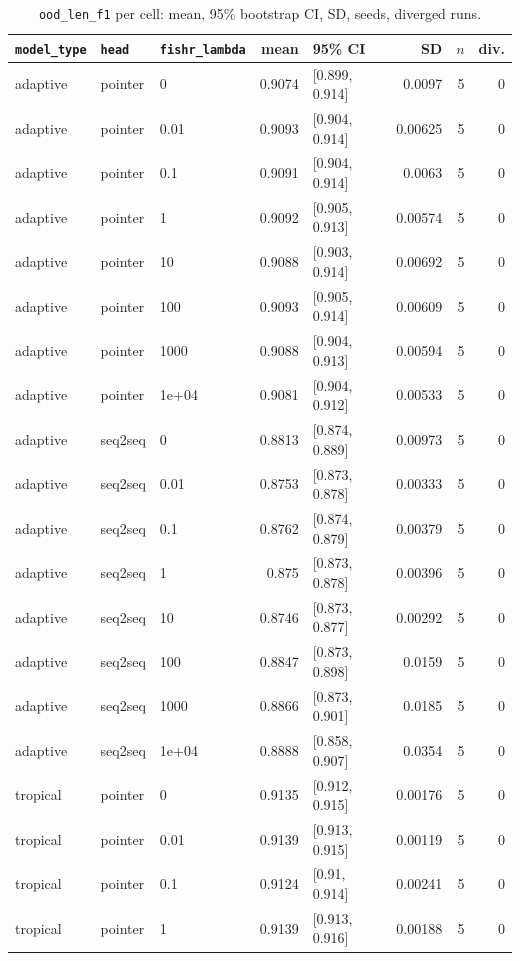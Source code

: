 \documentclass[10pt]{article}
\begin{document}
{\small
\begin{longtable}{lllrlrrr}
\caption{\texttt{ood\_len\_f1} per cell: mean, 95\% bootstrap CI, SD, seeds, diverged runs.}\label{tab:summary-ood_len_f1}\\
\toprule
\texttt{model\_type} & \texttt{head} & \texttt{fishr\_lambda} & mean & 95\% CI & SD & $n$ & div.\\
\midrule
\endhead
adaptive & pointer & 0 & 0.9074 & [0.899, 0.914] & 0.0097 & 5 & 0\\
adaptive & pointer & 0.01 & 0.9093 & [0.904, 0.914] & 0.00625 & 5 & 0\\
adaptive & pointer & 0.1 & 0.9091 & [0.904, 0.914] & 0.0063 & 5 & 0\\
adaptive & pointer & 1 & 0.9092 & [0.905, 0.913] & 0.00574 & 5 & 0\\
adaptive & pointer & 10 & 0.9088 & [0.903, 0.914] & 0.00692 & 5 & 0\\
adaptive & pointer & 100 & 0.9093 & [0.905, 0.914] & 0.00609 & 5 & 0\\
adaptive & pointer & 1000 & 0.9088 & [0.904, 0.913] & 0.00594 & 5 & 0\\
adaptive & pointer & 1e+04 & 0.9081 & [0.904, 0.912] & 0.00533 & 5 & 0\\
adaptive & seq2seq & 0 & 0.8813 & [0.874, 0.889] & 0.00973 & 5 & 0\\
adaptive & seq2seq & 0.01 & 0.8753 & [0.873, 0.878] & 0.00333 & 5 & 0\\
adaptive & seq2seq & 0.1 & 0.8762 & [0.874, 0.879] & 0.00379 & 5 & 0\\
adaptive & seq2seq & 1 & 0.875 & [0.873, 0.878] & 0.00396 & 5 & 0\\
adaptive & seq2seq & 10 & 0.8746 & [0.873, 0.877] & 0.00292 & 5 & 0\\
adaptive & seq2seq & 100 & 0.8847 & [0.873, 0.898] & 0.0159 & 5 & 0\\
adaptive & seq2seq & 1000 & 0.8866 & [0.873, 0.901] & 0.0185 & 5 & 0\\
adaptive & seq2seq & 1e+04 & 0.8888 & [0.858, 0.907] & 0.0354 & 5 & 0\\
tropical & pointer & 0 & 0.9135 & [0.912, 0.915] & 0.00176 & 5 & 0\\
tropical & pointer & 0.01 & 0.9139 & [0.913, 0.915] & 0.00119 & 5 & 0\\
tropical & pointer & 0.1 & 0.9124 & [0.91, 0.914] & 0.00241 & 5 & 0\\
tropical & pointer & 1 & 0.9139 & [0.913, 0.916] & 0.00188 & 5 & 0\\

\end{longtable}}
\end{document}
